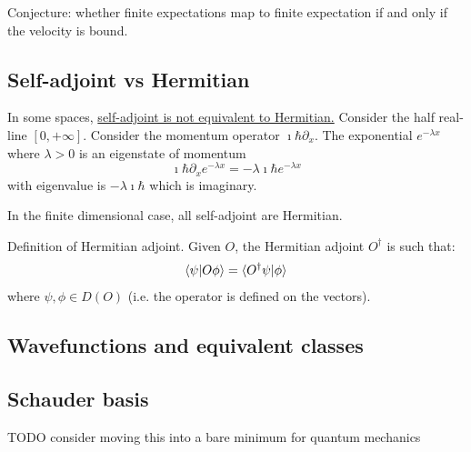 Conjecture: whether finite expectations map to finite expectation if and only if the velocity is bound.




\subsection{Self-adjoint vs Hermitian}

In some spaces,  \href{https://math.stackexchange.com/questions/38387/distinguishing-between-symmetric-hermitian-and-self-adjoint-operators}{self-adjoint is not equivalent to Hermitian.} Consider the half real-line $[0, +\infty]$. Consider the momentum operator $\imath \hbar \partial_x $. The exponential $e^{-\lambda x}$ where $\lambda > 0$ is an eigenstate of momentum
\begin{equation}
	\imath \hbar \partial_x e^{-\lambda x} = - \lambda \imath \hbar e^{-\lambda x}
\end{equation}
with eigenvalue is $- \lambda \imath \hbar$ which is imaginary.

In the finite dimensional case, all self-adjoint are Hermitian.

Definition of Hermitian adjoint. Given $O$, the Hermitian adjoint $O^\dagger$ is such that:
\begin{equation}
	\langle\psi|O \phi\rangle = \langle O^\dagger \psi | \phi \rangle
\end{equation}
where $\psi, \phi \in D(O)$ (i.e. the operator is defined on the vectors).

\subsection{Wavefunctions and equivalent classes}


\subsection{Schauder basis}
TODO consider moving this into a bare minimum for quantum mechanics

